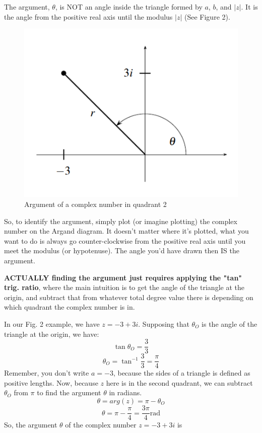 \documentclass{article}
\begin{document}
The argument, $\theta$, is NOT an angle inside the triangle formed by $a$, $b$, and $|z|$. It is the angle from the positive real axis until the modulus $|z|$ (See Figure 2).

\begin{figure}[H]
    \centering
    \includegraphics{../../../!assets/MATH1021-003-fig2.png}
    \caption{Argument of a complex number in quadrant 2}
\end{figure}

\noindent So, to identify the argument, simply plot (or imagine plotting)
the complex number on the Argand diagram. It doesn't matter where it's plotted, what you want to do is always go counter-clockwise from the positive real axis until you meet the modulus (or hypotenuse). The angle you'd have drawn then IS the argument.

\vspace{\baselineskip}

\noindent\textbf{ACTUALLY finding the argument just requires applying the "tan" trig. ratio}, where the main intuition is to get the angle of the triangle at the origin, and subtract that from whatever total degree value there is depending on which quadrant the complex number is in.

\begin{center}
    In our Fig. 2 example, we have $z=-3+3i$. Supposing that $\theta_O$ is the angle of the triangle at the origin, we have:
    $$\tan \theta_O=\frac{3}{3}$$
    $$\theta_O=\tan^{-1}\frac{3}{3}=\frac{\pi}{4}$$
    Remember, you don't write $a=-3$, because the sides of a triangle is defined as positive lengths. Now, because $z$ here is in the second quadrant, we can subtract $\theta_O$ from $\pi$ to find the argument $\theta$ in radians.
    $$\theta=arg(z)=\pi-\theta_O$$
    $$\theta=\pi-\frac{\pi}{4}=\frac{3\pi}{4} \text{rad}$$
    So, the argument $\theta$ of the complex number $z=-3+3i$ is 
\end{center}
\end{document}
